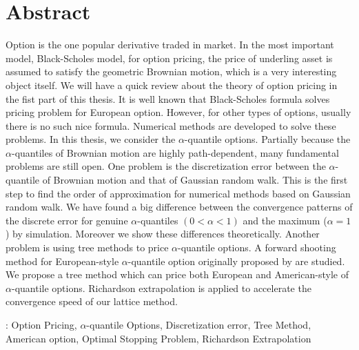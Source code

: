 \chapter{Abstract}
Option is the one popular derivative traded in market. 
In the most important model, Black-Scholes model, for option pricing, 
the price of underling asset is assumed to 
satisfy the geometric Brownian motion, 
which is a very interesting object itself. 
We will have a quick review about the theory of option pricing
in the fist part of this thesis.
It is well known that Black-Scholes formula solves pricing problem 
for European option.
However, for other types of options, usually there is no such nice formula. 
Numerical methods are developed to solve these problems. 
In this thesis, we consider the $\alpha$-quantile options. 
Partially because the $\alpha$-quantiles of Brownian motion 
are highly path-dependent, many fundamental problems are still open.
One problem is the discretization error between the $\alpha$-quantile 
of Brownian motion and that of Gaussian random walk. 
This is the first step to find the order of approximation for numerical 
methods based on Gaussian random walk.
We have found a big difference between the
convergence patterns of the discrete error for genuine $\alpha$-quantiles $(0< \alpha < 1)$
and the maximum ($\alpha=1$) by simulation. 
Moreover we show these differences theoretically.
Another problem is using tree methods to price 
$\alpha$-quantile options. A forward shooting method for European-style $\alpha$-quantile option originally proposed by \cite{Kwok2001} are studied. We propose a tree method which can price both European and American-style of $\alpha$-quantile options. Richardson extrapolation is applied to accelerate the convergence speed of our lattice method. 
\vspace{1cm}

: Option Pricing, $\alpha$-quantile Options, Discretization error, Tree Method, American option, Optimal Stopping Problem, Richardson Extrapolation
